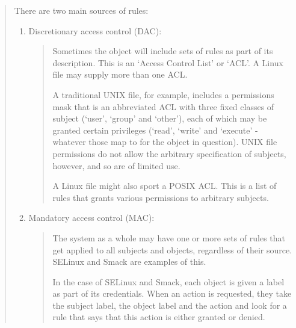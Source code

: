 \documentclass[a4paper,8pt,english]{sphinxmanual}
\begin{document}
\begin{enumerate}
\begin{quote}
There are two main sources of rules:
\begin{enumerate}
\item {} 
Discretionary access control (DAC):
\begin{quote}

Sometimes the object will include sets of rules as part of its
description.  This is an `Access Control List' or `ACL'.  A Linux
file may supply more than one ACL.

A traditional UNIX file, for example, includes a permissions mask that
is an abbreviated ACL with three fixed classes of subject (`user',
`group' and `other'), each of which may be granted certain privileges
(`read', `write' and `execute' - whatever those map to for the object
in question).  UNIX file permissions do not allow the arbitrary
specification of subjects, however, and so are of limited use.

A Linux file might also sport a POSIX ACL.  This is a list of rules
that grants various permissions to arbitrary subjects.
\end{quote}

\item {} 
Mandatory access control (MAC):
\begin{quote}

The system as a whole may have one or more sets of rules that get
applied to all subjects and objects, regardless of their source.
SELinux and Smack are examples of this.

In the case of SELinux and Smack, each object is given a label as part
of its credentials.  When an action is requested, they take the
subject label, the object label and the action and look for a rule
that says that this action is either granted or denied.
\end{quote}

\end{enumerate}
\end{quote}

\end{enumerate}
\end{document}
